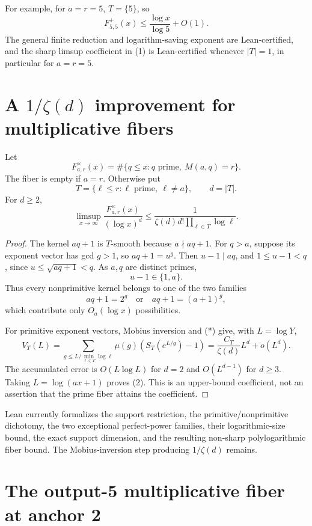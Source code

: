 \documentclass[10pt,a4paper]{scrartcl}
\begin{document}
For example, for $a=r=5$, $T=\{5\}$, so
\[
F^+_{5,5}(x)\le \frac{\log x}{\log5}+O(1).
\]
The general finite reduction and logarithm-saving exponent are Lean-certified, and the sharp limsup coefficient in (1) is Lean-certified whenever $|T|=1$, in particular for $a=r=5$.

\section{A \texorpdfstring{$1/\zeta(d)$}{1/zeta(d)} improvement for multiplicative fibers}

Let
\[
F^\times_{a,r}(x)=\#\{q\le x:q\text{ prime},\ M(a,q)=r\}.
\]
The fiber is empty if $a=r$. Otherwise put
\[
T=\{\ell\le r:\ell\text{ prime},\ \ell\ne a\},\qquad d=|T|.
\]
For $d\ge2$,
\begin{equation}
\limsup_{x\to\infty}\frac{F^\times_{a,r}(x)}{(\log x)^d}
\le \frac1{\zeta(d)d!\prod_{\ell\in T}\log\ell}. \tag{2}
\end{equation}

\begin{proof}
The kernel $aq+1$ is $T$-smooth because $a\nmid aq+1$. For $q>a$, suppose its exponent vector has gcd $g>1$, so $aq+1=u^g$. Then $u-1\mid aq$, and $1\le u-1<q$, since $u\le\sqrt{aq+1}<q$. As $a,q$ are distinct primes,
\[
u-1\in\{1,a\}.
\]
Thus every nonprimitive kernel belongs to one of the two families
\[
aq+1=2^g\quad\text{or}\quad aq+1=(a+1)^g,
\]
which contribute only $O_a(\log x)$ possibilities.

For primitive exponent vectors, Mobius inversion and (*) give, with $L=\log Y$,
\[
V_T(L)=\sum_{g\le L/\min_{\ell\in T}\log\ell}\mu(g)(S_T(e^{L/g})-1)
=\frac{C_T}{\zeta(d)}L^d+o(L^d).
\]
The accumulated error is $O(L\log L)$ for $d=2$ and $O(L^{d-1})$ for $d\ge3$. Taking $L=\log(ax+1)$ proves (2). This is an upper-bound coefficient, not an assertion that the prime fiber attains the coefficient.
\end{proof}

Lean currently formalizes the support restriction, the primitive/nonprimitive dichotomy, the two exceptional perfect-power families, their logarithmic-size bound, the exact support dimension, and the resulting non-sharp polylogarithmic fiber bound. The Mobius-inversion step producing $1/\zeta(d)$ remains.

\section{The output-5 multiplicative fiber at anchor 2}
\end{document}
